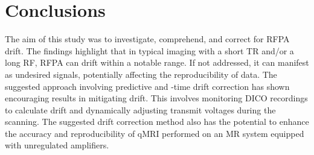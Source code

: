 
\section{Conclusions}\label{sec5}

The aim of this study was to investigate, comprehend, and correct for RFPA drift. The findings highlight that in typical imaging with a short TR and/or a long RF, RFPA can drift within a notable range. If not addressed, it can manifest as undesired signals, potentially affecting the reproducibility of data. The suggested approach involving predictive and -time drift correction has shown encouraging results in mitigating drift. This involves monitoring DICO recordings to calculate drift and dynamically adjusting transmit voltages during the scanning. The suggested drift correction method also has the potential to enhance the accuracy and reproducibility of qMRI performed on an MR system equipped with unregulated amplifiers.

